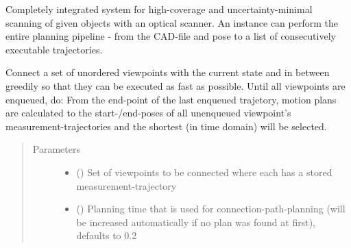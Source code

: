 \documentclass[letterpaper,10pt,english]{sphinxmanual}
\begin{document}
\begin{fulllineitems}
\label{\detokenize{module_trajectory_manager:agiprobot_measurement.trajectory_manager.TrajectoryManager}}
Completely integrated system for high-coverage and uncertainty-minimal scanning of given objects with an optical scanner. An instance can perform
the entire planning pipeline - from the CAD-file and pose to a list of consecutively executable trajectories.

\begin{fulllineitems}
\label{\detokenize{module_trajectory_manager:agiprobot_measurement.trajectory_manager.TrajectoryManager.connect_viewpoints}}
Connect a set of unordered viewpoints with the current state and in between greedily so that they can be executed as fast as possible.
Until all viewpoints are enqueued, do: From the end-point of the last enqueued trajetory, motion plans are calculated to the start-/end-poses
of all unenqueued viewpoint’s measurement-trajectories and the shortest (in time domain) will be selected.
\begin{quote}\begin{description}
\item[{Parameters}] \leavevmode\begin{itemize}
\item {} 
 (\sphinxstyleliteralemphasis{{[}}{\hyperref[\detokenize{module_view:module-agiprobot_measurement.viewpoint}]{\sphinxcrossref{\sphinxstyleliteralemphasis{viewpoint}}}}\sphinxstyleliteralemphasis{{]}}) \textendash{} Set of viewpoints to be connected where each has a stored measurement-trajectory

\item {} 
 (\sphinxstyleliteralemphasis{, }) \textendash{} Planning time that is used for connection-path-planning (will be increased automatically if no plan was found at first), defaults to 0.2

\end{itemize}


\end{description}
\end{quote}
\end{fulllineitems}
\end{fulllineitems}
\end{document}
